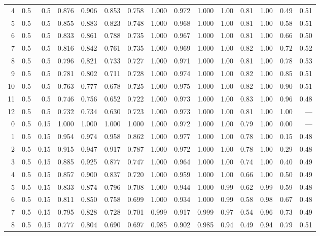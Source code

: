 \begin{landscape}
\begin{longtable}{rrrrrrrrrrrrrrr}
4 & 0.5 & 0.5 & 0.876 & 0.906 & 0.853 & 0.758 & 1.000 & 0.972 & 1.000 & 1.00 & 0.81 & 1.00 & 0.49 & 0.51 \\
5 & 0.5 & 0.5 & 0.855 & 0.883 & 0.823 & 0.748 & 1.000 & 0.968 & 1.000 & 1.00 & 0.81 & 1.00 & 0.58 & 0.51 \\
6 & 0.5 & 0.5 & 0.833 & 0.861 & 0.788 & 0.735 & 1.000 & 0.967 & 1.000 & 1.00 & 0.81 & 1.00 & 0.66 & 0.50 \\
7 & 0.5 & 0.5 & 0.816 & 0.842 & 0.761 & 0.735 & 1.000 & 0.969 & 1.000 & 1.00 & 0.82 & 1.00 & 0.72 & 0.52 \\
8 & 0.5 & 0.5 & 0.796 & 0.821 & 0.733 & 0.727 & 1.000 & 0.971 & 1.000 & 1.00 & 0.81 & 1.00 & 0.78 & 0.53 \\
9 & 0.5 & 0.5 & 0.781 & 0.802 & 0.711 & 0.728 & 1.000 & 0.974 & 1.000 & 1.00 & 0.82 & 1.00 & 0.85 & 0.51 \\
10 & 0.5 & 0.5 & 0.763 & 0.777 & 0.678 & 0.725 & 1.000 & 0.975 & 1.000 & 1.00 & 0.82 & 1.00 & 0.90 & 0.51 \\
11 & 0.5 & 0.5 & 0.746 & 0.756 & 0.652 & 0.722 & 1.000 & 0.973 & 1.000 & 1.00 & 0.83 & 1.00 & 0.96 & 0.48 \\
12 & 0.5 & 0.5 & 0.732 & 0.734 & 0.630 & 0.723 & 1.000 & 0.973 & 1.000 & 1.00 & 0.81 & 1.00 & 1.00 & --- \\
\midrule
0 & 0.5 & 0.15 & 1.000 & 1.000 & 1.000 & 1.000 & 1.000 & 0.972 & 1.000 & 1.00 & 0.79 & 1.00 & 0.00 & --- \\
1 & 0.5 & 0.15 & 0.954 & 0.974 & 0.958 & 0.862 & 1.000 & 0.977 & 1.000 & 1.00 & 0.78 & 1.00 & 0.15 & 0.48 \\
2 & 0.5 & 0.15 & 0.915 & 0.947 & 0.917 & 0.787 & 1.000 & 0.972 & 1.000 & 1.00 & 0.78 & 1.00 & 0.29 & 0.48 \\
3 & 0.5 & 0.15 & 0.885 & 0.925 & 0.877 & 0.747 & 1.000 & 0.964 & 1.000 & 1.00 & 0.74 & 1.00 & 0.40 & 0.49 \\
4 & 0.5 & 0.15 & 0.857 & 0.900 & 0.837 & 0.720 & 1.000 & 0.959 & 1.000 & 1.00 & 0.66 & 1.00 & 0.50 & 0.49 \\
5 & 0.5 & 0.15 & 0.833 & 0.874 & 0.796 & 0.708 & 1.000 & 0.944 & 1.000 & 0.99 & 0.62 & 0.99 & 0.59 & 0.48 \\
6 & 0.5 & 0.15 & 0.811 & 0.850 & 0.758 & 0.699 & 1.000 & 0.934 & 1.000 & 0.99 & 0.58 & 0.98 & 0.67 & 0.48 \\
7 & 0.5 & 0.15 & 0.795 & 0.828 & 0.728 & 0.701 & 0.999 & 0.917 & 0.999 & 0.97 & 0.54 & 0.96 & 0.73 & 0.49 \\
8 & 0.5 & 0.15 & 0.777 & 0.804 & 0.690 & 0.697 & 0.985 & 0.902 & 0.985 & 0.94 & 0.49 & 0.94 & 0.79 & 0.51 \\

\end{longtable}
\end{landscape}
